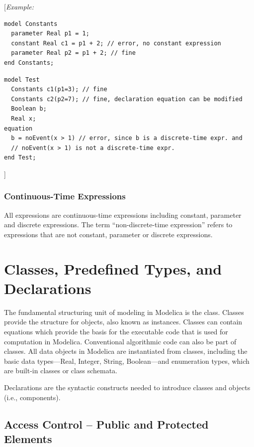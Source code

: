 \documentclass[10pt,a4paper]{report}
\def\Mcommentbegin#1{{[}\emph{#1}}
\def\Mcommentend#1{\emph{#1}{]}}
\def\doublelabel#1{\label{#1}\hypertarget{#1}{}}
\begin{document}
\Mcommentbegin{Example:}
\begin{lstlisting}[language=modelica]
model Constants
  parameter Real p1 = 1;
  constant Real c1 = p1 + 2; // error, no constant expression
  parameter Real p2 = p1 + 2; // fine
end Constants;
\end{lstlisting}
\begin{lstlisting}[language=modelica]
model Test
  Constants c1(p1=3); // fine
  Constants c2(p2=7); // fine, declaration equation can be modified
  Boolean b;
  Real x;
equation
  b = noEvent(x > 1) // error, since b is a discrete-time expr. and
  // noEvent(x > 1) is not a discrete-time expr.
end Test;
\end{lstlisting}
\Mcommentend{}

\subsection{Continuous-Time Expressions}\doublelabel{continuous-time-expressions}

All expressions are continuous-time expressions including constant,
parameter and discrete expressions. The term ``non-discrete-time
expression'' refers to expressions that are not constant, parameter or
discrete expressions.

\chapter{Classes, Predefined Types, and Declarations}\doublelabel{classes-predefined-types-and-declarations}

The fundamental structuring unit of modeling in Modelica is the class.
Classes provide the structure for objects, also known as instances.
Classes can contain equations which provide the basis for the executable
code that is used for computation in Modelica. Conventional algorithmic
code can also be part of classes. All data objects in Modelica are
instantiated from classes, including the basic data types---Real,
Integer, String, Boolean---and enumeration types, which are built-in
classes or class schemata.

Declarations are the syntactic constructs needed to introduce classes
and objects (i.e., components).

\section{Access Control -- Public and Protected Elements}\doublelabel{access-control}
\end{document}
